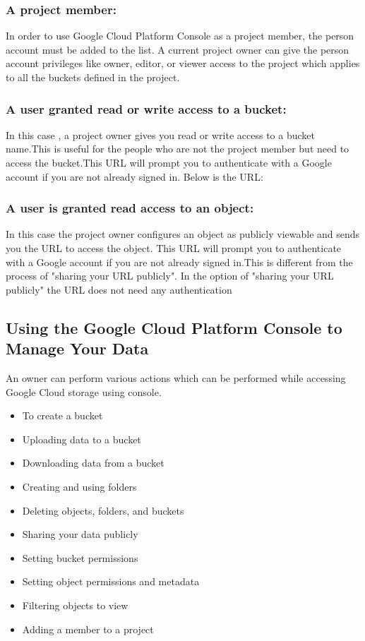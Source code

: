 \documentclass[9pt,twocolumn,twoside]{styles/osajnl}
\begin{document}
\subsubsection{ A project member:} In order to use Google Cloud Platform Console as a project member, the person account must be added to the list. A current project owner can give the person account privileges like owner, editor, or viewer access to the project which applies to all the buckets defined in the project.

\subsubsection{ A user granted read or write access to a bucket:}
In this case , a project owner  gives you read or write access to a bucket name.This is useful for the people who are not the project member but need to access the bucket.This URL will prompt you to authenticate with a Google account if you are not already signed in.
Below is the URL:

	

\subsubsection{ A user is granted read access to an object:}
In this case the project owner configures an object as publicly viewable and sends you the URL to access the object. This URL will prompt you to authenticate with a Google account if you are not already signed in.This is different from the process of "sharing your URL publicly". In the option of "sharing your URL publicly" the URL does not need any authentication



\subsection{Using the Google Cloud Platform Console to Manage Your Data}

An owner can perform various actions which can be performed while accessing Google Cloud storage using console.

\begin{itemize}


\item To create a bucket
\item Uploading data to a bucket
\item Downloading data from a bucket
\item Creating and using folders
\item Deleting objects, folders, and buckets
\item Sharing your data publicly
\item Setting bucket permissions
\item Setting object permissions and metadata
\item Filtering objects to view
\item Adding a member to a project

\end{itemize} 
\end{document}
